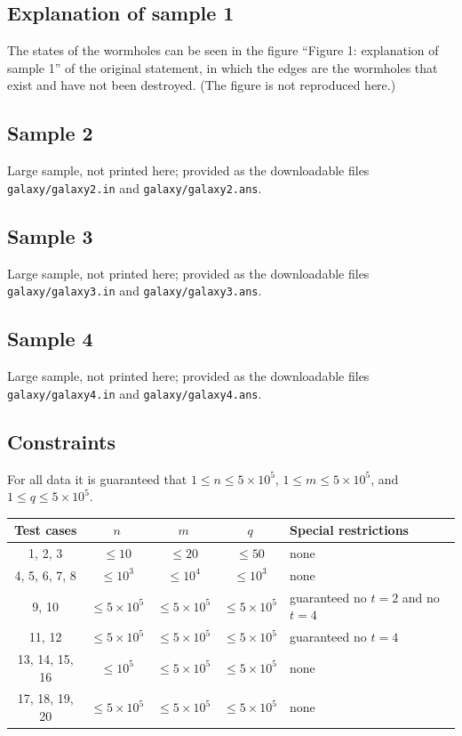 \documentclass[11pt]{article}
\begin{document}
\subsection*{Explanation of sample 1}

The states of the wormholes can be seen in the figure
``Figure 1: explanation of sample 1'' of the original statement,
in which the edges are the wormholes that exist and have not been
destroyed.
(The figure is not reproduced here.)

\subsection*{Sample 2}

Large sample, not printed here;
provided as the downloadable files \texttt{galaxy/galaxy2.in} and \texttt{galaxy/galaxy2.ans}.

\subsection*{Sample 3}

Large sample, not printed here;
provided as the downloadable files \texttt{galaxy/galaxy3.in} and \texttt{galaxy/galaxy3.ans}.

\subsection*{Sample 4}

Large sample, not printed here;
provided as the downloadable files \texttt{galaxy/galaxy4.in} and \texttt{galaxy/galaxy4.ans}.

\subsection*{Constraints}

For all data it is guaranteed that $1 \le n \le 5 \times 10^5$,
$1 \le m \le 5 \times 10^5$,
and $1 \le q \le 5 \times 10^5$.

\begin{center}
\begin{tabular}{ccccl}
\toprule
Test cases & $n$ & $m$ & $q$ & Special restrictions \\
\midrule
1, 2, 3 & $\le 10$ & $\le 20$ & $\le 50$ & none \\
4, 5, 6, 7, 8 & $\le 10^3$ & $\le 10^4$ & $\le 10^3$ & none \\
9, 10 & $\le 5 \times 10^5$ & $\le 5 \times 10^5$ & $\le 5 \times 10^5$
  & guaranteed no $t = 2$ and no $t = 4$ \\
11, 12 & $\le 5 \times 10^5$ & $\le 5 \times 10^5$ & $\le 5 \times 10^5$
  & guaranteed no $t = 4$ \\
13, 14, 15, 16 & $\le 10^5$ & $\le 5 \times 10^5$ & $\le 5 \times 10^5$
  & none \\
17, 18, 19, 20 & $\le 5 \times 10^5$ & $\le 5 \times 10^5$
  & $\le 5 \times 10^5$ & none \\
\bottomrule
\end{tabular}
\end{center}
\end{document}
